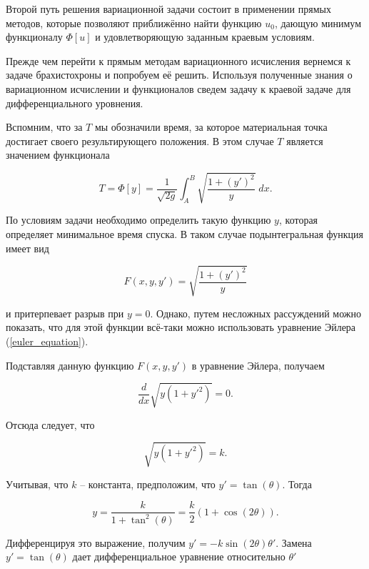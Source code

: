 \documentclass{article}
\begin{document}
Второй путь решения вариационной задачи состоит в применении прямых методов, которые позволяют приближённо найти функцию $u_{0}$, 
дающую минимум функционалу $\Phi[u]$ и удовлетворяющую заданным краевым условиям.

Прежде чем перейти к прямым методам вариационного исчисления вернемся к задаче брахистохроны и попробуем её решить. 
Используя полученные знания о вариационном исчислении и функционалов сведем задачу к краевой задаче для дифференциального уровнения.

Вспомним, что за $T$ мы обозначили время, за которое материальная точка достигает своего результирующего положения. 
В этом случае $T$ является значением функционала

\begin{displaymath}
	T = \Phi[y] = \frac{1}{\sqrt{2g}} \int_{A}^{B} \sqrt{\frac{1 + (y')^2}{y}} \; dx.
\end{displaymath}

\noindent По условиям задачи необходимо определить такую функцию $y$, которая определяет минимальное время спуска. В таком случае подынтегральная функция имеет вид

\begin{displaymath}
	F(x, y, y') = \sqrt{\frac{1 + (y')^2}{y}}
\end{displaymath}

\noindent и притерпевает разрыв при $y = 0$. Однако, путем несложных рассуждений можно показать, что для этой функции всё-таки можно использовать уравнение Эйлера (\ref{euler_equation}).

Подставляя данную функцию $F(x, y, y')$ в уравнение Эйлера, получаем

\begin{displaymath}
	\frac{d}{dx} \sqrt{y (1+y'^2)} = 0.
\end{displaymath}

\noindent Отсюда следует, что

\begin{displaymath}
	\sqrt{y (1+y'^2)} = k.
\end{displaymath}

\noindent Учитывая, что $k$ -- константа, предположим, что $y' = \tan(\theta)$. Тогда

\begin{displaymath}
	y = \frac{k}{1 + \tan^2(\theta)} = \frac{k}{2}(1 + \cos(2\theta)).
\end{displaymath}

\noindent Дифференцируя это выражение, получим $y' = -k \sin(2\theta) \theta'$. Замена $y' = \tan(\theta)$ дает дифференциальное уравнение относительно $\theta'$
\end{document}
